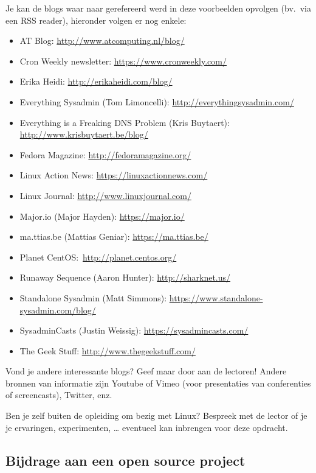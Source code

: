 Je kan de blogs waar naar gerefereerd werd in deze voorbeelden opvolgen (bv.\ via een RSS reader), hieronder volgen er nog enkele:

\begin{itemize}
\item AT Blog: \url{http://www.atcomputing.nl/blog/}
\item Cron Weekly newsletter: \url{https://www.cronweekly.com/}
\item Erika Heidi: \url{http://erikaheidi.com/blog/}
\item Everything Sysadmin (Tom Limoncelli): \url{http://everythingsysadmin.com/}
\item Everything is a Freaking DNS Problem (Kris Buytaert): \url{http://www.krisbuytaert.be/blog/}
\item Fedora Magazine: \url{http://fedoramagazine.org/}
\item Linux Action News: \url{https://linuxactionnews.com/}
\item Linux Journal: \url{http://www.linuxjournal.com/}
\item Major.io (Major Hayden): \url{https://major.io/}
\item ma.ttias.be (Mattias Geniar): \url{https://ma.ttias.be/}
\item Planet CentOS:\ \url{http://planet.centos.org/}
\item Runaway Sequence (Aaron Hunter): \url{http://sharknet.us/}
\item Standalone Sysadmin (Matt Simmons): \url{https://www.standalone-sysadmin.com/blog/}
\item SysadminCasts (Justin Weissig): \url{https://sysadmincasts.com/}
\item The Geek Stuff: \url{http://www.thegeekstuff.com/}
\end{itemize}

Vond je andere interessante blogs? Geef maar door aan de lectoren! Andere bronnen van informatie zijn Youtube of Vimeo (voor presentaties van conferenties of screencasts), Twitter, enz.

Ben je zelf buiten de opleiding om bezig met Linux? Bespreek met de lector of je je ervaringen, experimenten, \ldots{} eventueel kan inbrengen voor deze opdracht.

\subsection{Bijdrage aan een open source project}%
\label{subs:bijdrage-aan-een-open-source-project}

